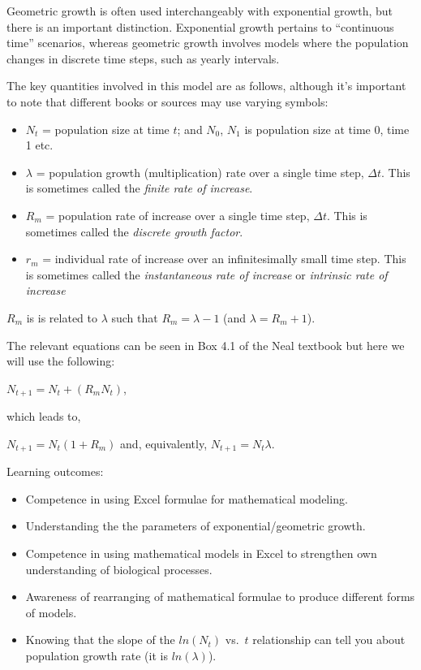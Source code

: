 \documentclass[
  a4paper]{book}
\providecommand{\tightlist}{%
  \setlength{\itemsep}{0pt}\setlength{\parskip}{0pt}}
\begin{document}
Geometric growth is often used interchangeably with exponential growth, but there is an important distinction. Exponential growth pertains to ``continuous time'' scenarios, whereas geometric growth involves models where the population changes in discrete time steps, such as yearly intervals.

The key quantities involved in this model are as follows, although it's important to note that different books or sources may use varying symbols:

\begin{itemize}
\tightlist
\item
  \(N_t\) = population size at time \(t\); and \(N_0\), \(N_1\) is population size at time 0, time 1 etc.
\item
  \(\lambda\) = population growth (multiplication) rate over a single time step, \(\Delta t\). This is sometimes called the \emph{finite rate of increase}.
\item
  \(R_m\) = population rate of increase over a single time step, \(\Delta t\). This is sometimes called the \emph{discrete growth factor}.
\item
  \(r_m\) = individual rate of increase over an infinitesimally small time step. This is sometimes called the \emph{instantaneous rate of increase} or \emph{intrinsic rate of increase}
\end{itemize}

\(R_m\) is is related to \(\lambda\) such that \(R_m = \lambda - 1\) (and \(\lambda = R_m + 1\)).

The relevant equations can be seen in Box 4.1 of the Neal textbook but here we will use the following:

\(N_{t+1} = N_t + (R_m N_t)\),

which leads to,

\(N_{t+1} = N_t (1 + R_m)\) and, equivalently, \(N_{t+1} = N_t \lambda\).

\begin{do-something}
Learning outcomes:

\begin{itemize}
\tightlist
\item
  Competence in using Excel formulae for mathematical modeling.
\item
  Understanding the the parameters of exponential/geometric growth.
\item
  Competence in using mathematical models in Excel to strengthen own
  understanding of biological processes.
\item
  Awareness of rearranging of mathematical formulae to produce different
  forms of models.
\item
  Knowing that the slope of the \(ln(N_t)\) vs.~\(t\) relationship can
  tell you about population growth rate (it is \(ln(\lambda)\)).
\end{itemize}
\end{do-something}
\end{document}
